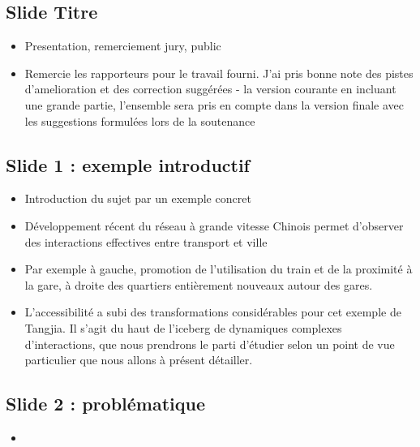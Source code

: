 \documentclass[11pt]{article}
\begin{document}
\subsection*{Slide Titre}

\begin{itemize}
	\item Presentation, remerciement jury, public
	\item Remercie les rapporteurs pour le travail fourni. J'ai pris bonne note des pistes d'amelioration et des correction suggérées - la version courante en incluant une grande partie, l'ensemble sera pris en compte dans la version finale avec les suggestions formulées lors de la soutenance
\end{itemize}



\subsection*{Slide 1 : exemple introductif}

\begin{itemize}
	\item Introduction du sujet par un exemple concret
	\item Développement récent du réseau à grande vitesse Chinois permet d'observer des interactions effectives entre transport et ville
	\item Par exemple à gauche, promotion de l'utilisation du train et de la proximité à la gare, à droite des quartiers entièrement nouveaux autour des gares.
	\item L'accessibilité a subi des transformations considérables pour cet exemple de Tangjia. Il s'agit du haut de l'iceberg de dynamiques complexes d'interactions, que nous prendrons le parti d'étudier selon un point de vue particulier que nous allons à présent détailler.
\end{itemize}



\subsection*{Slide 2 : problématique}


\begin{itemize}
	\item 
\end{itemize}













%
\end{document}
